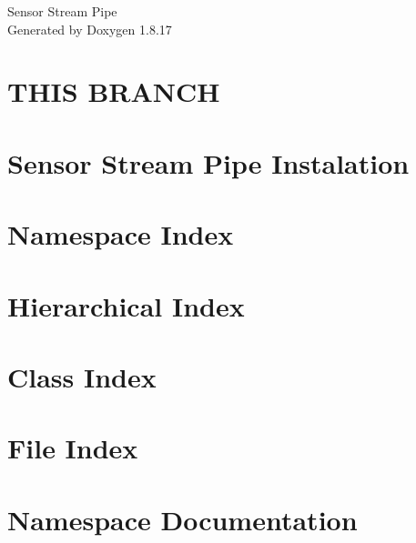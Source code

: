 \let\mypdfximage\pdfximage\def\pdfximage{\immediate\mypdfximage}\documentclass[twoside]{book}
\newcommand{\+}{\discretionary{\mbox{\scriptsize$\hookleftarrow$}}{}{}}
\newcommand{\clearemptydoublepage}{%
  \newpage{\pagestyle{empty}\cleardoublepage}%
}
\begin{document}
\hypersetup{pageanchor=false,
             bookmarksnumbered=true,
             pdfencoding=unicode
            }
\begin{titlepage}
\vspace*{7cm}
\begin{center}%
{\Large Sensor Stream Pipe }\\
\vspace*{1cm}
{\large Generated by Doxygen 1.8.17}\\
\end{center}
\end{titlepage}
\clearemptydoublepage
{}
\tableofcontents
\clearemptydoublepage
{}
\hypersetup{pageanchor=true}

\chapter{T\+H\+IS B\+R\+A\+N\+CH}
\label{index}\hypertarget{index}{}
\chapter{Sensor Stream Pipe Instalation}
\label{md_INSTALL}

\chapter{Namespace Index}

\chapter{Hierarchical Index}

\chapter{Class Index}

\chapter{File Index}

\chapter{Namespace Documentation}


\end{document}
